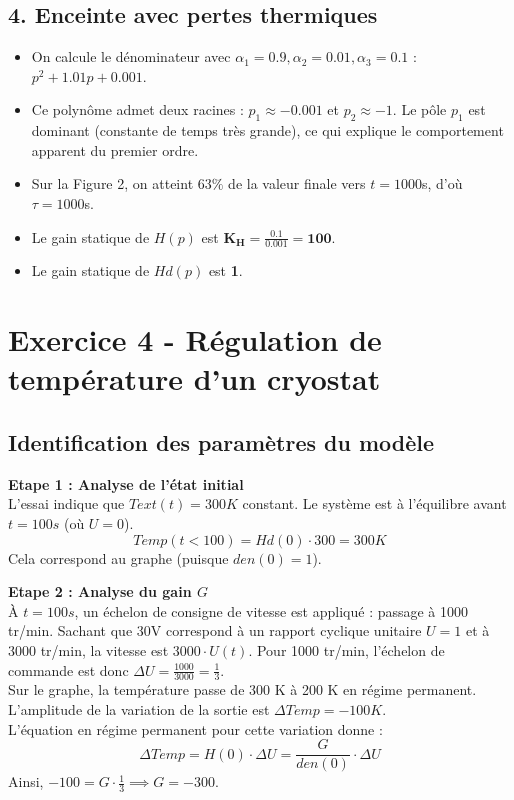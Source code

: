\documentclass[11pt,a4paper]{article}
\begin{document}
\subsection*{4. Enceinte avec pertes thermiques}

\begin{itemize}
    \item On calcule le dénominateur avec $\alpha_1=0.9, \alpha_2=0.01, \alpha_3=0.1$ : $p^2 + 1.01 p + 0.001$.
    \item Ce polynôme admet deux racines : $p_1 \approx -0.001$ et $p_2 \approx -1$. Le pôle $p_1$ est dominant (constante de temps très grande), ce qui explique le comportement apparent du premier ordre.
    \item Sur la Figure 2, on atteint $63\%$ de la valeur finale vers $t = 1000$s, d'où $\tau = 1000$s.
    \item Le gain statique de $H(p)$ est $\mathbf{K_H = \frac{0.1}{0.001} = 100}$.
    \item Le gain statique de $Hd(p)$ est \textbf{1}.
\end{itemize}

\hrulefill

\section*{Exercice 4 - Régulation de température d'un cryostat}

\subsection*{Identification des paramètres du modèle}

\textbf{Etape 1 : Analyse de l'état initial}\\
L'essai indique que $Text(t) = 300K$ constant. Le système est à l'équilibre avant $t=100s$ (où $U=0$).
$$
Temp(t<100) = Hd(0) \cdot 300 = 300 K
$$
Cela correspond au graphe (puisque $den(0)=1$).

\textbf{Etape 2 : Analyse du gain $G$}\\
À $t=100s$, un échelon de consigne de vitesse est appliqué : passage à 1000 tr/min.
Sachant que 30V correspond à un rapport cyclique unitaire $U=1$ et à 3000 tr/min, la vitesse est $3000 \cdot U(t)$.
Pour 1000 tr/min, l'échelon de commande est donc $\Delta U = \frac{1000}{3000} = \frac{1}{3}$.\\
Sur le graphe, la température passe de 300 K à 200 K en régime permanent. L'amplitude de la variation de la sortie est $\Delta Temp = -100 K$.\\
L'équation en régime permanent pour cette variation donne :
$$
\Delta Temp = H(0) \cdot \Delta U = \frac{G}{den(0)} \cdot \Delta U
$$
Ainsi, $-100 = G \cdot \frac{1}{3} \implies G = -300$.
\end{document}
